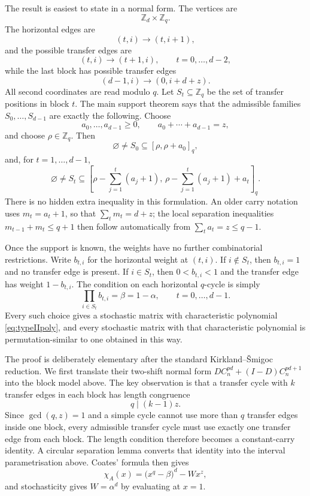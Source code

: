 \documentclass[11pt]{article}
\theoremstyle{definition}
\theoremstyle{remark}
\begin{document}
The result is easiest to state in a normal form.  The vertices are
\[
        \mathbb Z_d\times\mathbb Z_q .
\]
The horizontal edges are
\[
        (t,i)\longrightarrow (t,i+1),
\]
and the possible transfer edges are
\[
        (t,i)\longrightarrow (t+1,i),\qquad t=0,\ldots,d-2,
\]
while the last block has possible transfer edges
\[
        (d-1,i)\longrightarrow (0,i+d+z).
\]
All second coordinates are read modulo $q$.  Let $S_t\subseteq\mathbb Z_q$ be the set of transfer positions in block $t$.  The main support theorem says that the admissible families $S_0,\ldots,S_{d-1}$ are exactly the following.  Choose
\[
        a_0,\ldots,a_{d-1}\ge 0,
        \qquad a_0+\cdots+a_{d-1}=z,
\]
and choose $\rho\in\mathbb Z_q$.  Then
\[
        \varnothing\ne S_0\subseteq [\rho,\rho+a_0]_q,
\]
and, for $t=1,\ldots,d-1$,
\[
        \varnothing\ne S_t\subseteq
        \left[
        \rho-\sum_{j=1}^t(a_j+1),\,
        \rho-\sum_{j=1}^t(a_j+1)+a_t
        \right]_q .
\]
There is no hidden extra inequality in this formulation.  An older carry notation uses $m_t=a_t+1$, so that $\sum_t m_t=d+z$; the local separation inequalities $m_{t-1}+m_t\le q+1$ then follow automatically from $\sum_t a_t=z\le q-1$.

Once the support is known, the weights have no further combinatorial restrictions.  Write $b_{t,i}$ for the horizontal weight at $(t,i)$.  If $i\notin S_t$, then $b_{t,i}=1$ and no transfer edge is present.  If $i\in S_t$, then $0<b_{t,i}<1$ and the transfer edge has weight $1-b_{t,i}$.  The condition on each horizontal $q$-cycle is simply
\[
        \prod_{i\in S_t} b_{t,i}=\beta=1-\alpha,
        \qquad t=0,
        \ldots,d-1 .
\]
Every such choice gives a stochastic matrix with characteristic polynomial \eqref{eq:typeIIpoly}, and every stochastic matrix with that characteristic polynomial is permutation-similar to one obtained in this way.

The proof is deliberately elementary after the standard Kirkland--\v Smigoc reduction.  We first translate their two-shift normal form $D C_n^{pd}+(I-D)C_n^{pd+1}$ into the block model above.  The key observation is that a transfer cycle with $k$ transfer edges in each block has length congruence
\[
        q\mid (k-1)z .
\]
Since $\gcd(q,z)=1$ and a simple cycle cannot use more than $q$ transfer edges inside one block, every admissible transfer cycle must use exactly one transfer edge from each block. The length condition therefore becomes a constant-carry identity. A circular separation lemma converts that identity into the interval parametrisation above. Coates' formula then gives
\[
        \chi_A(x)=\bigl(x^q-\beta\bigr)^d-Wx^z,
\]
and stochasticity gives $W=\alpha^d$ by evaluating at $x=1$.
\end{document}
